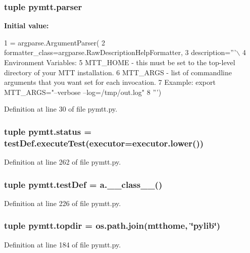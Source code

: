 \hypertarget{namespacepymtt_a95d54fdad48aac280be9d57cf81dee68}{
\subsubsection[{parser}]{\setlength{\rightskip}{0pt plus 5cm}tuple pymtt.\-parser}}\label{namespacepymtt_a95d54fdad48aac280be9d57cf81dee68}
{\bfseries Initial value\-:}
\begin{DoxyCode}
1 = argparse.ArgumentParser(
2     formatter\_class=argparse.RawDescriptionHelpFormatter,
3     description=\textcolor{stringliteral}{'''\(\backslash\)}
4 \textcolor{stringliteral}{Environment Variables:}
5 \textcolor{stringliteral}{  MTT\_HOME - this must be set to the top-level directory of your MTT installation.}
6 \textcolor{stringliteral}{  MTT\_ARGS - list of commandline arguments that you want set for each invocation.}
7 \textcolor{stringliteral}{    Example: export MTT\_ARGS="--verbose --log=/tmp/out.log"}
8 \textcolor{stringliteral}{'''})
\end{DoxyCode}


Definition at line 30 of file pymtt.\-py.

\hypertarget{namespacepymtt_a1a2fd13626c1c2d248cedc138e8660ec}{
\subsubsection[{status}]{\setlength{\rightskip}{0pt plus 5cm}tuple pymtt.\-status = test\-Def.\-execute\-Test({\bf executor}=executor.\-lower())}}\label{namespacepymtt_a1a2fd13626c1c2d248cedc138e8660ec}


Definition at line 262 of file pymtt.\-py.

\hypertarget{namespacepymtt_afebe539e6104da8ebd3d06b7a0e77fe7}{
\subsubsection[{test\-Def}]{\setlength{\rightskip}{0pt plus 5cm}tuple pymtt.\-test\-Def = a.\-\_\-\-\_\-class\-\_\-\-\_\-()}}\label{namespacepymtt_afebe539e6104da8ebd3d06b7a0e77fe7}


Definition at line 226 of file pymtt.\-py.

\hypertarget{namespacepymtt_ac673c895b8c93a029d2a1655c04af315}{
\subsubsection[{topdir}]{\setlength{\rightskip}{0pt plus 5cm}tuple pymtt.\-topdir = os.\-path.\-join({\bf mtthome}, \char`\"{}pylib\char`\"{})}}\label{namespacepymtt_ac673c895b8c93a029d2a1655c04af315}


Definition at line 184 of file pymtt.\-py.

